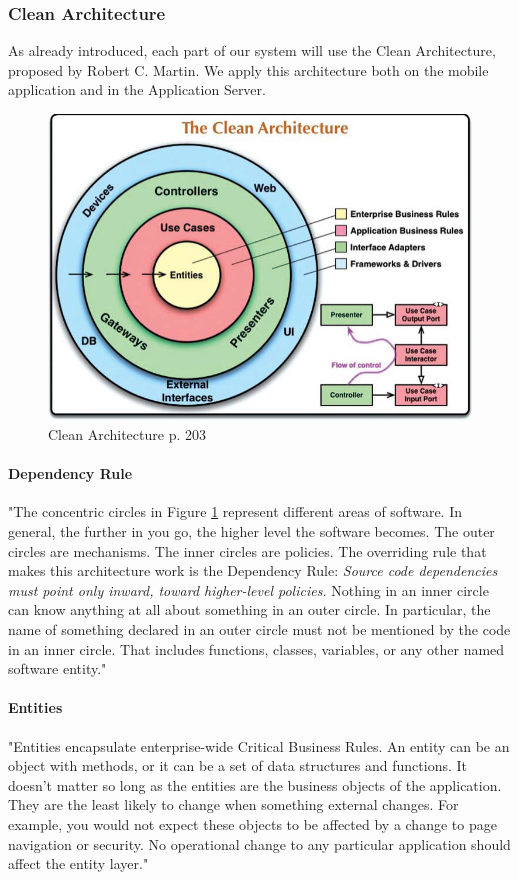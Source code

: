 \subsubsection{Clean Architecture}
As already introduced, each part of our system will use the Clean Architecture, proposed by Robert C. Martin. We apply this architecture both on the mobile application and in the Application Server.

\begin{figure}[H]
\centering
\includegraphics[width=.7\textwidth]{Images/cleanArchi.pdf}
\caption{\label{fig:cleanArchi} Clean Architecture \cite{clean} p. 203}
\end{figure}

\paragraph{Dependency Rule}
"The concentric circles in Figure \ref{fig:cleanArchi} represent different areas of software. In general, the further in you go, the higher level the software becomes. The outer circles are mechanisms. The inner circles are policies.
The overriding rule that makes this architecture work is the Dependency Rule:
\textit{Source code dependencies must point only inward, toward higher-level policies.}
Nothing in an inner circle can know anything at all about something in an outer circle. In particular, the name of something declared in an outer circle must not be mentioned by the code in an inner circle. That includes functions, classes, variables, or any other named software entity." \cite{clean}

\paragraph{Entities}
"Entities encapsulate enterprise-wide Critical Business Rules. An entity can be an object with methods, or it can be a set of data structures and functions. It doesn’t matter so long as the entities are the business objects of the application. They are the least likely to change when something external changes. For example, you would not expect these objects to be affected by a change to page navigation or security. No operational change to any particular application should affect the entity layer." \cite{clean}

